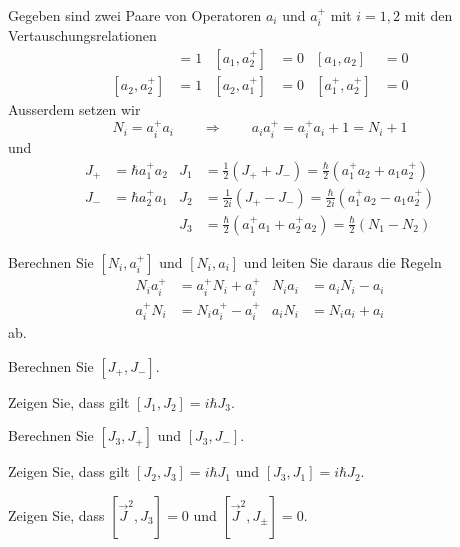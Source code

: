 Gegeben sind zwei Paare von Operatoren $a_i$ und $a_i^+$ mit $i=1,2$
mit den Vertauschungsrelationen
\begin{align*}
[a_1,a_1^+]&=1&[a_1,a_2^+]&=0&[a_1,a_2]&=0\\
[a_2,a_2^+]&=1&[a_2,a_1^+]&=0&[a_1^+,a_2^+]&=0
\end{align*}
Ausserdem setzen wir 
\[
N_i=a_i^+a_i
\qquad
\Rightarrow
\qquad
a_ia_i^+=a_i^+a_i+1=N_i+1
\]
und
\begin{align*}
J_+
&=
\hbar a_1^+a_2
&
J_1
&=
\frac12(J_++J_-)
=
\frac{\hbar}2(a_1^+a_2+a_1a_2^+)
\\
J_-
&=
\hbar a_2^+a_1
&
J_2
&=
\frac1{2i}(J_+-J_-)
=
\frac{\hbar}{2i}(a_1^+a_2-a_1a_2^+)
\\
&&
J_3
&=
\frac{\hbar}2(a_1^+a_1+a_2^+a_2)
=
\frac{\hbar}2(N_1-N_2)
\end{align*}
\begin{teilaufgaben}
\item Berechnen Sie $[N_i,a_i^+]$ und $[N_i,a_i]$ und leiten Sie daraus
die Regeln
\begin{align*}
N_ia_i^+&= a_i^+ N_i + a_i^+
&
N_ia_i  &= a_i   N_i - a_i
\\
a_i^+N_i&= N_ia_i^+ - a_i^+
&
a_i N_i  &= N_i a_i   + a_i
\end{align*}
ab.
\item Berechnen Sie $[J_+,J_-]$.
\item Zeigen Sie, dass gilt $[J_1,J_2]=i\hbar J_3$.
\item Berechnen Sie $[J_3,J_+]$ und $[J_3,J_-]$.
\item Zeigen Sie, dass gilt $[J_2,J_3]=i\hbar J_1$ und $[J_3,J_1]=i\hbar J_2$.
\item Zeigen Sie, dass $[\vec J^2, J_3]=0$ und $[\vec J^2,J_\pm]=0$.
\end{teilaufgaben}

